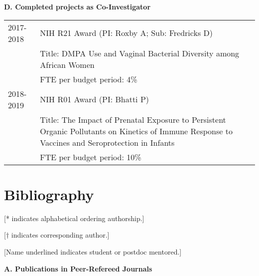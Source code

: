 \documentclass[10pt]{article}
\begin{document}
 \textbf{D. Completed projects as Co-Investigator}
\begin{table}[H]
\hskip0.9cm\begin{tabular}{p{1.6cm}p{12cm}}
2017-2018 & NIH R21 Award (PI: Roxby A; Sub: Fredricks D)\\
&		Title: DMPA Use and Vaginal Bacterial Diversity among African Women\\
&		FTE per budget period: 4\%\\
2018-2019 & NIH R01 Award (PI: Bhatti P)\\
&	Title: The Impact of Prenatal Exposure to Persistent Organic Pollutants on Kinetics of Immune Response to Vaccines and Seroprotection in Infants\\
&		FTE per budget period: 10\%
\end{tabular}
\end{table}

\section{Bibliography}

[* indicates alphabetical ordering authorship.]

[$\dagger$ indicates corresponding author.]

[Name underlined indicates student or postdoc mentored.]

\medskip

\textbf{A. Publications in Peer-Refereed Journals}
\end{document}
